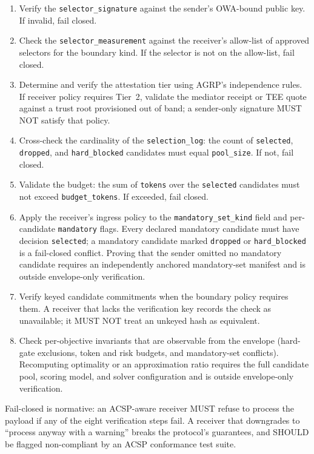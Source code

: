 \begin{enumerate}
  \item Verify the \texttt{selector\_signature} against
    the sender's OWA-bound public key. If invalid, fail
    closed.
  \item Check the \texttt{selector\_measurement} against
    the receiver's allow-list of approved selectors for
    the boundary kind. If the selector is not on the
    allow-list, fail closed.
  \item Determine and verify the attestation tier using
    AGRP's independence rules. If receiver policy requires
    Tier~2, validate the mediator receipt or TEE quote
    against a trust root provisioned out of band; a
    sender-only signature MUST NOT satisfy that policy.
  \item Cross-check the cardinality of the
    \texttt{selection\_log}: the count of
    \texttt{selected}, \texttt{dropped}, and
    \texttt{hard\_blocked} candidates must equal
    \texttt{pool\_size}. If not, fail closed.
  \item Validate the budget: the sum of \texttt{tokens}
    over the \texttt{selected} candidates must not exceed
    \texttt{budget\_tokens}. If exceeded, fail closed.
  \item Apply the receiver's ingress policy to the
    \texttt{mandatory\_set\_kind} field and per-candidate
    \texttt{mandatory} flags. Every declared mandatory
    candidate must have decision \texttt{selected}; a
    mandatory candidate marked \texttt{dropped} or
    \texttt{hard\_blocked} is a
    fail-closed conflict. Proving that the sender omitted no
    mandatory candidate requires an independently anchored
    mandatory-set manifest and is outside envelope-only
    verification.
  \item Verify keyed candidate commitments when the
    boundary policy requires them. A receiver that lacks
    the verification key records the check as unavailable;
    it MUST NOT treat an unkeyed hash as equivalent.
  \item Check per-objective invariants that are observable
    from the envelope (hard-gate exclusions, token and risk
    budgets, and mandatory-set conflicts). Recomputing
    optimality or an approximation ratio requires the full
    candidate pool, scoring model, and solver configuration
    and is outside envelope-only verification.
\end{enumerate}

Fail-closed is normative: an ACSP-aware receiver MUST
refuse to process the payload if any of the eight
verification steps fail. A receiver that downgrades to
``process anyway with a warning'' breaks the protocol's
guarantees, and SHOULD be flagged non-compliant by an
ACSP conformance test suite.

